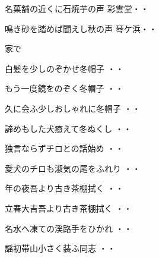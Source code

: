 \begin{shiika}名菓舗の近くに石焼芋の声
彩雲堂\hfill{・・}\end{shiika}
\begin{shiika}鳴き砂を踏めば聞えし秋の声
琴ケ浜\hfill{・・}\end{shiika}
\vspace{0.6cm}
家で
\begin{shiika}白髪を少しのぞかせ冬帽子
\hfill{・・}\end{shiika}
\vspace{0.6cm}
\begin{shiika}もう一度鏡をのぞく冬帽子
\hfill{・・}\end{shiika}
\vspace{0.6cm}
\begin{shiika}久に会ふ少しおしゃれに冬帽子
\hfill{・・}\end{shiika}
\vspace{0.6cm}
\begin{shiika}諦めもした犬癒えて冬ぬくし
\hfill{・・}\end{shiika}
\vspace{0.6cm}
\begin{shiika}独言ならずチロとの話始め
\hfill{・・}\end{shiika}
\vspace{0.6cm}
\begin{shiika}愛犬のチロも淑気の尾をふれり
\hfill{・・}\end{shiika}
\vspace{0.6cm}
\begin{shiika}年の夜吾より古き茶棚拭く
\hfill{・・}\end{shiika}
\vspace{0.6cm}
\begin{shiika}立春大吉吾より古き茶棚拭く
\hfill{・・}\end{shiika}
\vspace{0.6cm}
\begin{shiika}名水へ凍ての渓路手をひかれ
\hfill{・・}\end{shiika}
\vspace{0.6cm}
\begin{shiika}謡初帯山小さく装ふ同志
\hfill{・・}\end{shiika}
